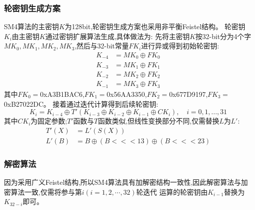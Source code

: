 \subsubsection{轮密钥生成方案}
SM4算法的主密钥$K$为128bit,轮密钥生成方案也采用非平衡Feistel结构。
轮密钥\(K_i\)由主密钥\(K\)通过密钥扩展算法生成,具体做法为:
先将主密钥\(K\)按32-bit分为4个字\(MK_0,MK_1,MK_2,MK_3\),然后与32-bit常量\(FK_i\)进行异或得到初始轮密钥:
\[
\begin{aligned}
    K_{-4} &= MK_0 \oplus FK_0 \\
    K_{-3} &= MK_1 \oplus FK_1 \\
    K_{-2} &= MK_2 \oplus FK_2 \\
    K_{-1} &= MK_3 \oplus FK_3
\end{aligned}
\]
其中$FK_0 = $0xA3B1BAC6,$FK_1 = $0x56AA3350,$FK_2 = $0x677D9197,$FK_3 = $0xB27022DC。
接着通过迭代计算得到后续轮密钥:
\[
K_i = K_{i-4} \oplus T'(K_{i-3} \oplus K_{i-2} \oplus K_{i-1} \oplus CK_i), \quad i=0,1,...,31
\]
其中$CK_i$为固定参数;\(T'\)函数与\(T\)函数类似,但线性变换部分不同,仅需替换$L$为$L'$:
\[
\begin{aligned}
    T'(X) &= L'(S(X)) \\
    L'(B) &= B \oplus (B <<< 13) \oplus (B <<< 23)
\end{aligned}  
\]

\subsubsection{解密算法}
因为采用广义Feistel结构,所以SM4算法具有加解密结构一致性,因此解密算法与加密算法一致,仅需将参与第$i(i = 1,2,\cdots,32)$轮迭代
运算的轮密钥由$K_{i-1}$替换为$K_{32-i}$即可。